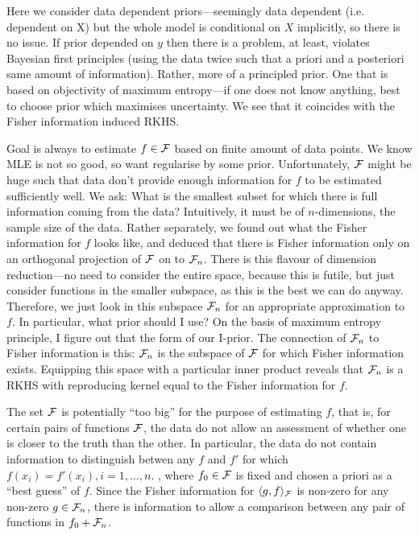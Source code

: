Here we consider data dependent priors---seemingly data dependent (i.e. dependent on X) but the whole model is conditional on $X$ implicitly, so there is no issue.
If prior depended on $y$ then there is a problem, at least, violates Bayesian first principles (using the data twice such that a priori and a posteriori same amount of information).
Rather, more of a principled prior. One that is based on objectivity of maximum entropy---if one does not know anything, best to choose prior which maximises uncertainty.
We see that it coincides with the Fisher information induced RKHS.

Goal is always to estimate $f \in {\mathcal F}$ based on finite amount of data points.
We know MLE is not so good, so want regularise by some prior.
Unfortunately, ${\mathcal F}$ might be huge such that data don't provide enough information for $f$ to be estimated sufficiently well.
We ask: What is the smallest subset for which there is full information coming from the data? 
Intuitively, it must be of $n$-dimensions, the sample size of the data.
Rather separately, we found out what the Fisher information for $f$ looks like, and deduced that there is Fisher information only on an orthogonal projection of ${\mathcal F}$ on to ${\mathcal F}_n$.
There is this flavour of dimension reduction---no need to consider the entire space, because this is futile, but just consider functions in the smaller subspace, as this is the best we can do anyway.
Therefore, we just look in this subspace ${\mathcal F}_n$ for an appropriate approximation to $f$. 
In particular, what prior should I use? On the basis of maximum entropy principle, I figure out that the form of our I-prior.
The connection of ${\mathcal F}_n$ to Fisher information is this: ${\mathcal F}_n$ is the subspace of ${\mathcal F}$ for which Fisher information exists. Equipping this space with a particular inner product reveals that ${\mathcal F}_n$ is a RKHS with reproducing kernel equal to the Fisher information for $f$.

The set ${\mathcal F}$ is potentially ``too big'' for the purpose of estimating $f$, that is, for certain pairs of functions ${\mathcal F}$, the data do not allow an assessment of whether one is closer to the truth than the other.
In particular, the data do not contain information to distinguish betwen any $f$ and $f'$ for which $f(x_i) = f'(x_i), i=1,\dots,n$.
  , where $f_0 \in {\mathcal F}$ is fixed and chosen a priori as a ``best guess'' of $f$.
Since the Fisher information for $\langle g,f\rangle_{\mathcal F}$ is non-zero for any non-zero $g \in {\mathcal F}_n$, there is information to allow a comparison between any pair of functions in $f_0 + {\mathcal F}_n$.

